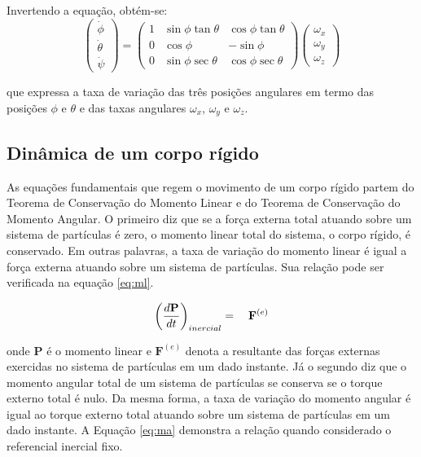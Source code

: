 \documentclass[a4paper, 12pt]{article}
\begin{document}
\noindent Invertendo a equação, obtém-se:
\begin{equation}
\begin{pmatrix} 
	{\dot {\phi}} \\ { \dot {\theta}} \\ { \dot { \psi}} 
\end{pmatrix} = 
\begin{pmatrix} 
	1 & \sin {\phi\tan{\theta}}& \cos{\phi\tan{\theta}}  \\ 
	0 & \cos {\phi}  & -\sin{\phi}  \\ 
	0 & \sin {\phi\sec{\theta}}  & \cos{\phi\sec{\theta}} 
\end{pmatrix}
\begin{pmatrix} 
	{ \omega  }_{ x } \\ { \omega  }_{ y } \\ { \omega  }_{ z }
\end{pmatrix} 
\end{equation}

\noindent que expressa a taxa de variação das três posições angulares em termo das posições $\phi$ e $\theta$ e das taxas angulares ${\omega}_{x}$, ${\omega}_{y}$ e ${\omega}_{z}$.

\subsection{Dinâmica de um corpo rígido}

 

As equações fundamentais que regem o movimento de um corpo rígido partem do Teorema de Conservação do Momento Linear e do Teorema de Conservação do Momento Angular. O primeiro diz que se a força externa total atuando sobre um sistema de partículas é zero, o momento linear total do sistema, o corpo rígido, é conservado. Em outras palavras, a taxa de variação do momento linear é igual a força externa atuando sobre um sistema de partículas. Sua relação pode ser verificada na equação \ref{eq:ml}.

\begin{equation}
\centering
{ \left(\frac { d\mathbf{P} }{ dt }\right)}_{inercial} = \quad{ \mathbf{F} }^{ (e) }
\label{eq:ml}
\end{equation}

\noindent onde $\mathbf{P}$ é o momento linear e ${ \mathbf{F} }^{ (e) }$ denota a resultante das forças externas exercidas no sistema de partículas em um dado instante. Já o segundo diz que o momento angular total de um sistema de partículas se conserva se o torque externo total é nulo. Da mesma forma, a taxa de variação do momento angular é igual ao torque externo total atuando sobre um sistema de partículas em um dado instante. A Equação \ref{eq:ma} demonstra a relação quando considerado o referencial inercial fixo.
\end{document}
